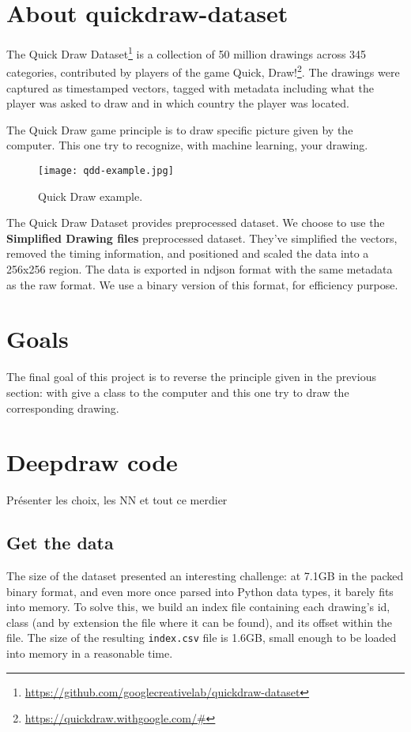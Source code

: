 \documentclass[
  10pt, 
  a4paper,
  oneside, 
  headinclude, 
  footinclude, 
  BCOR5mm, 
]{scrartcl}
\begin{document}
\section{About quickdraw-dataset}

The Quick Draw Dataset\footnote{\url{https://github.com/googlecreativelab/quickdraw-dataset}} is a collection of 50 million drawings across 345 categories, contributed by players of the game Quick, Draw!\footnote{\url{https://quickdraw.withgoogle.com/\#}}. The drawings were captured as timestamped vectors, tagged with metadata including what the player was asked to draw and in which country the player was located.

The Quick Draw game principle is to draw specific picture given by the computer. This one try to recognize, with machine learning, your drawing.

\begin{figure}[h]
	\center
	\texttt{[image: qdd-example.jpg]}
	\caption{Quick Draw example.}
	\label{promo-asylamba}
\end{figure}

The Quick Draw Dataset provides preprocessed dataset. We choose to use the \textbf{Simplified Drawing files} preprocessed dataset. They've simplified the vectors, removed the timing information, and positioned and scaled the data into a 256x256 region. The data is exported in ndjson format with the same metadata as the raw format. We use a binary version of this format, for efficiency purpose.


\section{Goals}

The final goal of this project is to reverse the principle given in the previous section: with give a class to the computer and this one try to draw the corresponding drawing.


\section{Deepdraw code}

Présenter les choix, les NN et tout ce merdier

\subsection{Get the data}

The size of the dataset presented an interesting challenge: at 7.1GB in the
packed binary format, and even more once parsed into Python data types, it
barely fits into memory. To solve this, we build an index file containing each
drawing's id, class (and by extension the file where it can be found), and its
offset within the file. The size of the resulting \texttt{index.csv} file is
1.6GB, small enough to be loaded into memory in a reasonable time.
\end{document}
